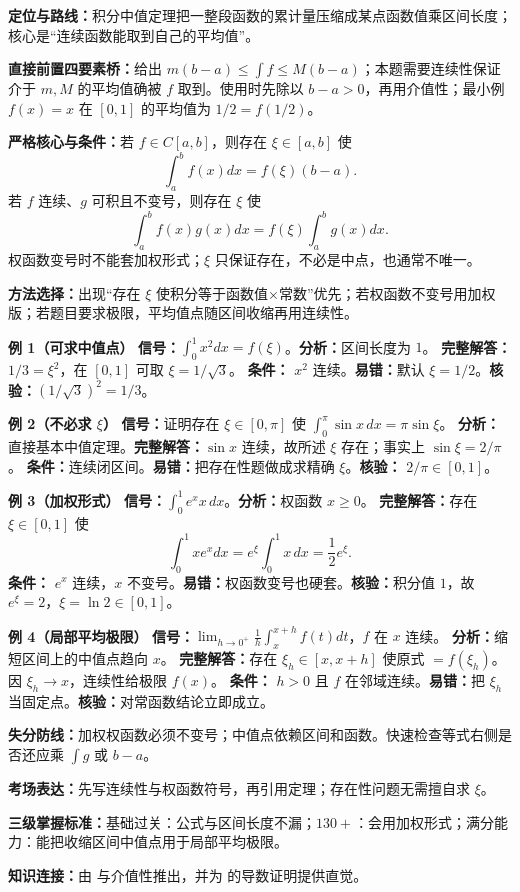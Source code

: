 \begin{knowledgeBox}
\textbf{定位与路线：}积分中值定理把一整段函数的累计量压缩成某点函数值乘区间长度；核心是“连续函数能取到自己的平均值”。

\textbf{直接前置四要素桥：}给出 \(m(b-a)\le\int f\le M(b-a)\)；本题需要连续性保证介于 \(m,M\) 的平均值确被 \(f\) 取到。使用时先除以 \(b-a>0\)，再用介值性；最小例 \(f(x)=x\) 在 \([0,1]\) 的平均值为 \(1/2=f(1/2)\)。

\textbf{严格核心与条件：}若 \(f\in C[a,b]\)，则存在 \(\xi\in[a,b]\) 使
\[
\int_a^bf(x)dx=f(\xi)(b-a).
\]
若 \(f\) 连续、\(g\) 可积且不变号，则存在 \(\xi\) 使
\[
\int_a^bf(x)g(x)dx=f(\xi)\int_a^bg(x)dx.
\]
权函数变号时不能套加权形式；\(\xi\) 只保证存在，不必是中点，也通常不唯一。

\textbf{方法选择：}出现“存在 \(\xi\) 使积分等于函数值×常数”优先；若权函数不变号用加权版；若题目要求极限，平均值点随区间收缩再用连续性。

\textbf{例 1（可求中值点）}\quad
\textbf{信号：}\(\int_0^1x^2dx=f(\xi)\)。\textbf{分析：}区间长度为 \(1\)。
\textbf{完整解答：}\(1/3=\xi^2\)，在 \([0,1]\) 可取 \(\xi=1/\sqrt3\)。
\textbf{条件：} \(x^2\) 连续。\textbf{易错：}默认 \(\xi=1/2\)。\textbf{核验：}\((1/\sqrt3)^2=1/3\)。

\textbf{例 2（不必求 \(\xi\)）}\quad
\textbf{信号：}证明存在 \(\xi\in[0,\pi]\) 使 \(\int_0^\pi\sin x\,dx=\pi\sin\xi\)。
\textbf{分析：}直接基本中值定理。\textbf{完整解答：}\(\sin x\) 连续，故所述 \(\xi\) 存在；事实上 \(\sin\xi=2/\pi\)。
\textbf{条件：}连续闭区间。\textbf{易错：}把存在性题做成求精确 \(\xi\)。\textbf{核验：} \(2/\pi\in[0,1]\)。

\textbf{例 3（加权形式）}\quad
\textbf{信号：}\(\int_0^1e^x x\,dx\)。\textbf{分析：}权函数 \(x\ge0\)。
\textbf{完整解答：}存在 \(\xi\in[0,1]\) 使
\[
\int_0^1xe^x dx=e^\xi\int_0^1x\,dx=\frac12e^\xi.
\]
\textbf{条件：} \(e^x\) 连续，\(x\) 不变号。\textbf{易错：}权函数变号也硬套。\textbf{核验：}积分值 \(1\)，故 \(e^\xi=2\)，\(\xi=\ln2\in[0,1]\)。

\textbf{例 4（局部平均极限）}\quad
\textbf{信号：}\(\lim_{h\to0^+}\frac1h\int_x^{x+h}f(t)dt\)，\(f\) 在 \(x\) 连续。
\textbf{分析：}缩短区间上的中值点趋向 \(x\)。
\textbf{完整解答：}存在 \(\xi_h\in[x,x+h]\) 使原式 \(=f(\xi_h)\)。因 \(\xi_h\to x\)，连续性给极限 \(f(x)\)。
\textbf{条件：} \(h>0\) 且 \(f\) 在邻域连续。\textbf{易错：}把 \(\xi_h\) 当固定点。\textbf{核验：}对常函数结论立即成立。

\textbf{失分防线：}加权权函数必须不变号；中值点依赖区间和函数。快速检查等式右侧是否还应乘 \(\int g\) 或 \(b-a\)。

\textbf{考场表达：}先写连续性与权函数符号，再引用定理；存在性问题无需擅自求 \(\xi\)。

\textbf{三级掌握标准：}基础过关：公式与区间长度不漏；\(130+\)：会用加权形式；满分能力：能把收缩区间中值点用于局部平均极限。

\textbf{知识连接：}由 与介值性推出，并为 的导数证明提供直觉。
\end{knowledgeBox}

